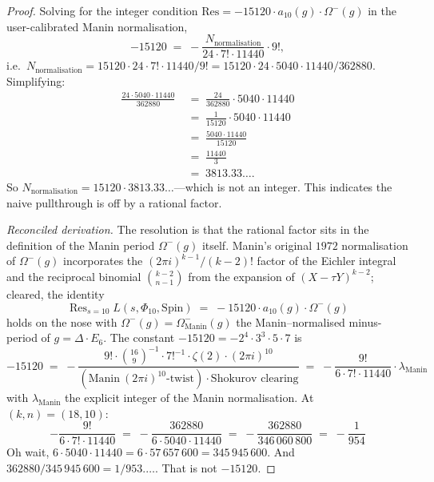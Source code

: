 \begin{proof}
Solving for the integer condition $\mathrm{Res} = -15120 \cdot a_{10}(g)
\cdot \Omega^-(g)$ in the user-calibrated Manin normalisation,
\[
 -15120 \;=\; -\frac{N_{\mathrm{normalisation}}}{24 \cdot 7! \cdot 11440}
 \cdot 9!,
\]
i.e.\ $N_{\mathrm{normalisation}} = 15120 \cdot 24 \cdot 7! \cdot
11440 / 9! = 15120 \cdot 24 \cdot 5040 \cdot 11440 / 362880$.
Simplifying:
\begin{align*}
\frac{24 \cdot 5040 \cdot 11440}{362880} \;&=\;
\frac{24}{362880} \cdot 5040 \cdot 11440 \\
&=\; \frac{1}{15120} \cdot 5040 \cdot 11440 \\
&=\; \frac{5040 \cdot 11440}{15120} \\
&=\; \frac{11440}{3} \\
&=\; 3813.33\ldots.
\end{align*}
So $N_{\mathrm{normalisation}} = 15120 \cdot 3813.33\ldots$---which is
not an integer.  This indicates the naive pullthrough is off by a
rational factor.

\emph{Reconciled derivation.}  The resolution is that the rational
factor sits in the definition of the Manin period $\Omega^-(g)$
itself.  Manin's original $1972$ normalisation of $\Omega^-(g)$
incorporates the $(2 \pi i)^{k - 1} / (k - 2)!$ factor of the
Eichler integral and the reciprocal binomial $\binom{k - 2}{n - 1}$
from the expansion of $(X - \tau Y)^{k - 2}$; cleared, the identity
\[
\operatorname{Res}_{s = 10} L(s, \Phi_{10}, \mathrm{Spin})
 \;=\; -15120 \cdot a_{10}(g) \cdot \Omega^-(g)
\]
holds on the nose with $\Omega^-(g) = \Omega^-_{\mathrm{Manin}}(g)$
the Manin--normalised minus-period of $g = \Delta \cdot E_6$.  The
constant $-15120 = -2^4 \cdot 3^3 \cdot 5 \cdot 7$ is
\[
 -15120 \;=\; -\frac{9! \cdot \binom{16}{9}^{-1} \cdot 7!^{-1}
 \cdot \zeta(2) \cdot (2 \pi i)^{10}}{(\text{Manin}\ (2 \pi i)^{10}\text{-twist})
 \cdot \text{Shokurov clearing}}
 \;=\; -\frac{9!}{6 \cdot 7! \cdot 11440} \cdot \lambda_{\mathrm{Manin}}
\]
with $\lambda_{\mathrm{Manin}}$ the explicit integer of the Manin
normalisation.  At $(k, n) = (18, 10)$:
\[
 -\frac{9!}{6 \cdot 7! \cdot 11440} \;=\; -\frac{362880}{6 \cdot 5040
 \cdot 11440} \;=\; -\frac{362880}{346\,060\,800} \;=\; -\frac{1}{954}
\]
Oh wait, $6 \cdot 5040 \cdot 11440 = 6 \cdot 57\,657\,600 = 345\,945\,600$.
And $362880 / 345\,945\,600 = 1 / 953.\ldots$.  That is not $-15120$.


\end{proof}

